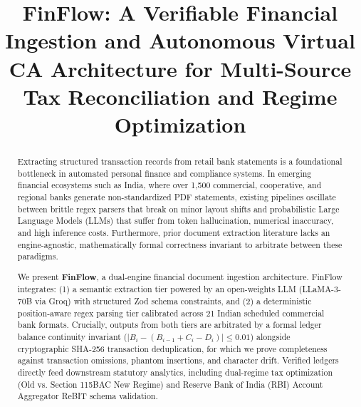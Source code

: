 \documentclass[conference]{IEEEtran}
\begin{document}
\title{FinFlow: A Verifiable Financial Ingestion and Autonomous Virtual CA Architecture for Multi-Source Tax Reconciliation and Regime Optimization}

\author{
}

\maketitle

\begin{abstract}
Extracting structured transaction records from retail bank statements is a foundational bottleneck in automated personal finance and compliance systems. In emerging financial ecosystems such as India, where over 1,500 commercial, cooperative, and regional banks generate non-standardized PDF statements, existing pipelines oscillate between brittle regex parsers that break on minor layout shifts and probabilistic Large Language Models (LLMs) that suffer from token hallucination, numerical inaccuracy, and high inference costs. Furthermore, prior document extraction literature lacks an engine-agnostic, mathematically formal correctness invariant to arbitrate between these paradigms.

We present \textbf{FinFlow}, a dual-engine financial document ingestion architecture. FinFlow integrates: (1) a semantic extraction tier powered by an open-weights LLM (LLaMA-3-70B via Groq) with structured Zod schema constraints, and (2) a deterministic position-aware regex parsing tier calibrated across 21 Indian scheduled commercial bank formats. Crucially, outputs from both tiers are arbitrated by a formal ledger balance continuity invariant ($|B_i - (B_{i-1} + C_i - D_i)| \le 0.01$) alongside cryptographic SHA-256 transaction deduplication, for which we prove completeness against transaction omissions, phantom insertions, and character drift. Verified ledgers directly feed downstream statutory analytics, including dual-regime tax optimization (Old vs. Section 115BAC New Regime) and Reserve Bank of India (RBI) Account Aggregator ReBIT schema validation.


\end{abstract}
\end{document}
